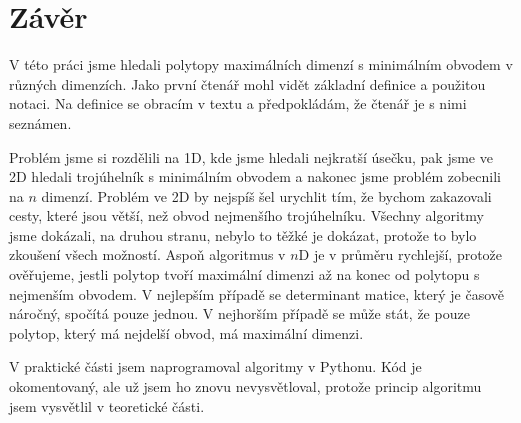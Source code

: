 \chapter*{Závěr}

V této práci jsme hledali polytopy maximálních dimenzí s minimálním obvodem v různých dimenzích. Jako první čtenář mohl vidět základní definice a použitou notaci. Na definice se obracím v textu a předpokládám, že čtenář je s nimi seznámen. 

Problém jsme si rozdělili na 1D, kde jsme hledali nejkratší úsečku, pak jsme ve 2D hledali trojúhelník s minimálním obvodem  a nakonec jsme problém zobecnili na $n$ dimenzí. Problém ve 2D by nejspíš šel urychlit tím, že bychom zakazovali cesty, které jsou větší, než obvod nejmenšího trojúhelníku. Všechny algoritmy jsme dokázali, na druhou stranu, nebylo to těžké je dokázat, protože to bylo zkoušení všech možností. Aspoň algoritmus v $n$D je v průměru rychlejší, protože ověřujeme, jestli polytop tvoří maximální dimenzi až na konec od polytopu s nejmenším obvodem. V nejlepším případě se determinant matice, který je časově náročný, spočítá pouze jednou. V nejhorším případě se může stát, že pouze polytop, který má nejdelší obvod, má maximální dimenzi. 

V praktické části jsem naprogramoval algoritmy v Pythonu. Kód je okomentovaný, ale už jsem ho znovu nevysvětloval, protože  princip algoritmu jsem vysvětlil v teoretické části. 
